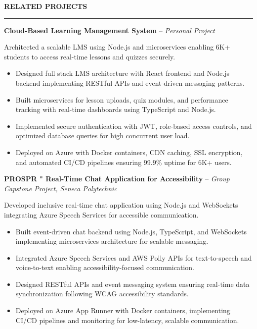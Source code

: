 \documentclass[10pt,letterpaper]{article}
\begin{document}
\vspace{6pt}

\textbf{RELATED PROJECTS}\\[-8pt]
\noindent\rule{\textwidth}{1pt}

\vspace{-2pt}

\textbf{Cloud-Based Learning Management System} -- \emph{Personal Project}

\vspace{-1pt}

Architected a scalable LMS using Node.js and microservices enabling 6K+ students to access real-time lessons and quizzes securely.
\vspace{-1pt}
\begin{itemize}
\item Designed full stack LMS architecture with React frontend and Node.js backend implementing RESTful APIs and event-driven messaging patterns.
\item Built microservices for lesson uploads, quiz modules, and performance tracking with real-time dashboards using TypeScript and Node.js.
\item Implemented secure authentication with JWT, role-based access controls, and optimized database queries for high concurrent user load.
\item Deployed on Azure with Docker containers, CDN caching, SSL encryption, and automated CI/CD pipelines ensuring 99.9\% uptime for 6K+ users.
\end{itemize}

\textbf{PROSPR " Real-Time Chat Application for Accessibility} -- \emph{Group Capstone Project, Seneca Polytechnic}

\vspace{-1pt}

Developed inclusive real-time chat application using Node.js and WebSockets integrating Azure Speech Services for accessible communication.
\vspace{-1pt}
\begin{itemize}
\item Built event-driven chat backend using Node.js, TypeScript, and WebSockets implementing microservices architecture for scalable messaging.
\item Integrated Azure Speech Services and AWS Polly APIs for text-to-speech and voice-to-text enabling accessibility-focused communication.
\item Designed RESTful APIs and event messaging system ensuring real-time data synchronization following WCAG accessibility standards.
\item Deployed on Azure App Runner with Docker containers, implementing CI/CD pipelines and monitoring for low-latency, scalable communication.
\end{itemize}
\end{document}
